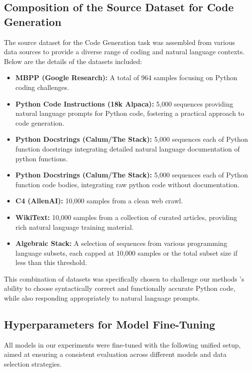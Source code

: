 \subsection{Composition of the Source Dataset for Code Generation}
\label{app:subsec:dataset_composition_code}

The source dataset for the Code Generation task was assembled from various data sources to provide a diverse range of coding and natural language contexts. Below are the details of the datasets included:

\begin{itemize}
    \item \textbf{MBPP (Google Research):} A total of 964 samples focusing on Python coding challenges.
    \item \textbf{Python Code Instructions (18k Alpaca):} 5,000 sequences providing natural language prompts for Python code, fostering a practical approach to code generation.
    \item \textbf{Python Docstrings (Calum/The Stack):} 5,000 sequences each of Python function docstrings integrating detailed natural language documentation of python functions.
    \item \textbf{Python Docstrings (Calum/The Stack):} 5,000 sequences each of Python function code bodies, integrating raw python code without documentation.
    \item \textbf{C4 (AllenAI):} 10,000 samples from a clean web crawl.
    \item \textbf{WikiText:} 10,000 samples from a collection of curated articles, providing rich natural language training material.
    \item \textbf{Algebraic Stack:} A selection of sequences from various programming language subsets, each capped at 10,000 samples or the total subset size if less than this threshold.
\end{itemize}

This combination of datasets was specifically chosen to challenge our methods 's ability to choose syntactically correct and functionally accurate Python code, while also responding appropriately to natural language prompts. 

\subsection{Hyperparameters for Model Fine-Tuning}

All models in our experiments were fine-tuned with the following unified setup, aimed at ensuring a consistent evaluation across different models and data selection strategies.

